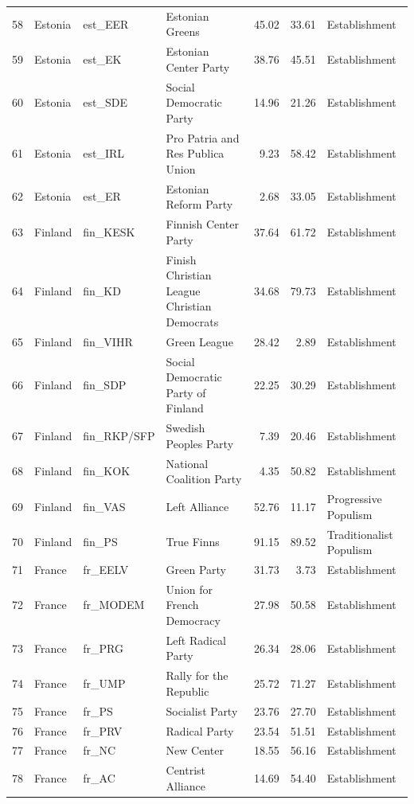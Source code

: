 \begin{landscape}
\begin{longtable}[c]{@{\extracolsep{\fill}}rlllrrl}
  58 & Estonia & est\_EER & Estonian Greens & 45.02 & 33.61 & Establishment \\ 
  59 & Estonia & est\_EK & Estonian Center Party & 38.76 & 45.51 & Establishment \\ 
  60 & Estonia & est\_SDE & Social Democratic Party & 14.96 & 21.26 & Establishment \\ 
  61 & Estonia & est\_IRL & Pro Patria and Res Publica Union & 9.23 & 58.42 & Establishment \\ 
  62 & Estonia & est\_ER & Estonian Reform Party & 2.68 & 33.05 & Establishment \\ 
  63 & Finland & fin\_KESK & Finnish Center Party & 37.64 & 61.72 & Establishment \\ 
  64 & Finland & fin\_KD & Finish Christian League Christian Democrats & 34.68 & 79.73 & Establishment \\ 
  65 & Finland & fin\_VIHR & Green League & 28.42 & 2.89 & Establishment \\ 
  66 & Finland & fin\_SDP & Social Democratic Party of Finland & 22.25 & 30.29 & Establishment \\ 
  67 & Finland & fin\_RKP/SFP & Swedish Peoples Party & 7.39 & 20.46 & Establishment \\ 
  68 & Finland & fin\_KOK & National Coalition Party & 4.35 & 50.82 & Establishment \\ 
  69 & Finland & fin\_VAS & Left Alliance & 52.76 & 11.17 & Progressive Populism \\ 
  70 & Finland & fin\_PS & True Finns & 91.15 & 89.52 & Traditionalist Populism \\ 
  71 & France & fr\_EELV & Green Party & 31.73 & 3.73 & Establishment \\ 
  72 & France & fr\_MODEM & Union for French Democracy & 27.98 & 50.58 & Establishment \\ 
  73 & France & fr\_PRG & Left Radical Party & 26.34 & 28.06 & Establishment \\ 
  74 & France & fr\_UMP & Rally for the Republic & 25.72 & 71.27 & Establishment \\ 
  75 & France & fr\_PS & Socialist Party & 23.76 & 27.70 & Establishment \\ 
  76 & France & fr\_PRV & Radical Party & 23.54 & 51.51 & Establishment \\ 
  77 & France & fr\_NC & New Center & 18.55 & 56.16 & Establishment \\ 
  78 & France & fr\_AC & Centrist Alliance & 14.69 & 54.40 & Establishment \\ 

\end{longtable}
\end{landscape}
